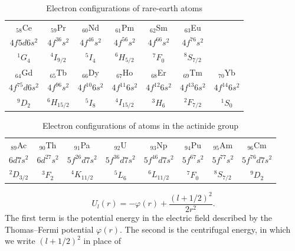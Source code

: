 \begin{table}[ht]
\centering\scriptsize
\caption{Electron configurations of rare-earth atoms}
\begin{tabular}{ccccccc}
$_{58}$Ce&$_{59}$Pr&$_{60}$Nd&$_{61}$Pm&$_{62}$Sm&$_{63}$Eu\\
$4f5d6s^2$&$4f^36s^2$&$4f^46s^2$&$4f^56s^2$&$4f^66s^2$&$4f^76s^2$\\
$^1G_4$&$^4I_{9/2}$&$^5I_4$&$^6H_{5/2}$&$^7F_0$&$^8S_{7/2}$\\\hline
$_{64}$Gd&$_{65}$Tb&$_{66}$Dy&$_{67}$Ho&$_{68}$Er&$_{69}$Tm&$_{70}$Yb\\
$4f^75d6s^2$&$4f^96s^2$&$4f^{10}6s^2$&$4f^{11}6s^2$&$4f^{12}6s^2$&$4f^{13}6s^2$&$4f^{14}6s^2$\\
$^9D_2$&$^6H_{15/2}$&$^5I_8$&$^4I_{15/2}$&$^3H_6$&$^2F_{7/2}$&$^1S_0$
\end{tabular}
\end{table}

\begin{table}[ht]
\centering\scriptsize
\caption{Electron configurations of atoms in the actinide group}
\begin{tabular}{cccccccc}
$_{89}$Ac&$_{90}$Th&$_{91}$Pa&$_{92}$U&$_{93}$Np&$_{94}$Pu&$_{95}$Am&$_{96}$Cm\\
$6d7s^2$&$6d^27s^2$&$5f^26d7s^2$&$5f^36d7s^2$&$5f^46d7s^2$&$5f^67s^2$&$5f^77s^2$&$5f^76d7s^2$\\
$^2D_{3/2}$&$^3F_2$&$^4K_{11/2}$&$^5L_6$&$^6L_{11/2}$&$^7F_0$&$^8S_{7/2}$&$^9D_2$
\end{tabular}
\end{table}


\[
 U_l(r)=-\varphi(r)+\frac{(l+1/2)^2}{2r^2}.
\]
The first term is the potential energy in the electric field described by the Thomas--Fermi potential $\varphi(r)$. The second is the centrifugal energy, in which we write $(l+1/2)^2$ in place of

